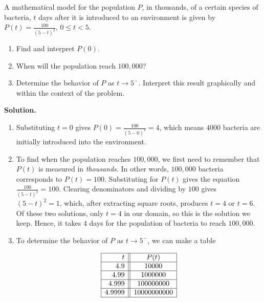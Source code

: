 \begin{ex}  A mathematical model for the population $P$, in thousands, of a certain species of bacteria, $t$ days after it is introduced to an environment is given by $P(t) = \frac{100}{(5-t)^{2}}$, $0 \leq t < 5$.


\begin{enumerate}

\item  Find and interpret $P(0)$.

\item  When will the population reach $100,\!000$?

\item  Determine the behavior of $P$ as $t \rightarrow 5^{-}$.  Interpret this result graphically and within the context of the problem. 

\end{enumerate}

{ \bf Solution.}  

\begin{enumerate}

\item  Substituting $t=0$ gives $P(0) = \frac{100}{(5-0)^2} = 4$, which means $4000$ bacteria are initially introduced into the environment.

\item  To find when the population reaches $100,\! 000$, we first need to remember that $P(t)$ is measured in \textit{thousands}.  In other words, $100,\! 000$ bacteria corresponds to $P(t) = 100$.  Substituting for $P(t)$ gives the equation  $\frac{100}{(5-t)^2} = 100$.  Clearing denominators and dividing by $100$ gives $(5-t)^2=1$, which, after extracting square roots, produces $t = 4$ or $t=6$.  Of these two solutions, only $t=4$ in our domain, so this is the solution we keep.  Hence, it takes $4$ days for the population of bacteria to reach $100,\! 000$.

\item To determine the behavior of $P$ as $t \rightarrow 5^{-}$, we can make a table

\[\begin{array}{|r||c|}  \hline

  t & P(t)  \\ \hline
 4.9 & 10000  \\  \hline
 4.99 & 1000000  \\  \hline
 4.999 &  100000000  \\  \hline
  4.9999 & 10000000000  \\  \hline
  \end{array}\]


\end{enumerate}
\end{ex}
